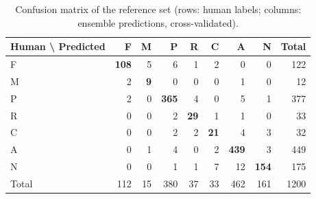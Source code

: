 \begin{table}[htbp]
\centering
\caption{Confusion matrix of the reference set (rows: human labels; columns: ensemble predictions, cross-validated).}
\label{tab:confusion_matrix}
\small
\begin{tabular}{l|rrrrrrr|r}
\toprule
Human \textbackslash{} Predicted & F & M & P & R & C & A & N & Total \\
\midrule
F & \textbf{108} & 5 & 6 & 1 & 2 & 0 & 0 & 122 \\
M & 2 & \textbf{9} & 0 & 0 & 0 & 1 & 0 & 12 \\
P & 2 & 0 & \textbf{365} & 4 & 0 & 5 & 1 & 377 \\
R & 0 & 0 & 2 & \textbf{29} & 1 & 1 & 0 & 33 \\
C & 0 & 0 & 2 & 2 & \textbf{21} & 4 & 3 & 32 \\
A & 0 & 1 & 4 & 0 & 2 & \textbf{439} & 3 & 449 \\
N & 0 & 0 & 1 & 1 & 7 & 12 & \textbf{154} & 175 \\
\midrule
Total & 112 & 15 & 380 & 37 & 33 & 462 & 161 & 1200 \\
\bottomrule
\end{tabular}
\end{table}
